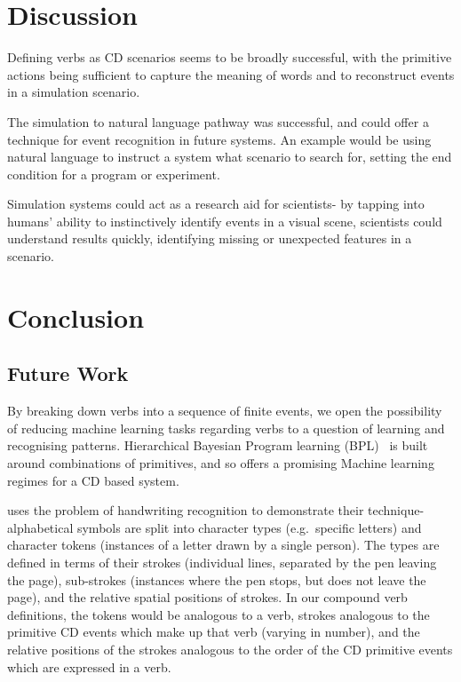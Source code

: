 \documentclass[12pt,MSc,wordcount,twoside]{muthesis}
\begin{document}

    \section{Discussion}
    Defining verbs as CD scenarios seems to be broadly successful, with the primitive actions being sufficient to capture the meaning of words and to reconstruct events in a simulation scenario.

    The simulation to natural language pathway was successful, and could offer a technique for event recognition in future systems. An example would be using natural language to instruct a system what scenario to search for, setting the end condition for a program or experiment.

    Simulation systems could act as a research aid for scientists- by tapping into humans' ability to instinctively identify events in a visual scene, scientists could understand results quickly, identifying missing or unexpected features in a scenario.

    \section{Conclusion}
    \subsection{Future Work}
    By breaking down verbs into a sequence of finite events, we open the possibility of reducing machine learning tasks regarding verbs to a question of learning and recognising patterns. Hierarchical Bayesian Program learning (BPL)~\cite{one-shot-learning} is built around combinations of primitives, and so offers a promising Machine learning regimes for a CD based system.

    \citealt{one-shot-learning} uses the problem of handwriting recognition to demonstrate their technique- alphabetical symbols are split into character types (e.g.~specific letters) and character tokens (instances of a letter drawn by a single person). The types are defined in terms of their strokes (individual lines, separated by the pen leaving the page), sub-strokes (instances where the pen stops, but does not leave the page), and the relative spatial positions of strokes. In our compound verb definitions, the tokens would be analogous to a verb, strokes analogous to the primitive CD events which make up that verb (varying in number), and the relative positions of the strokes analogous to the order of the CD primitive events which are expressed in a verb.
    
\end{document}
